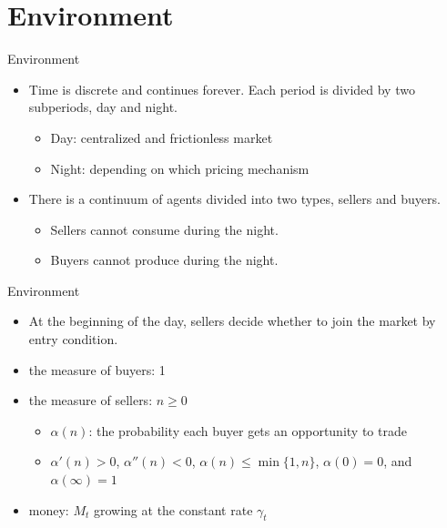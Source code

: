 \documentclass{beamer}
\begin{document}
\section{Environment}

\begin{frame}{Environment}
    \begin{itemize}
        \item Time is discrete and continues forever. Each period is divided by two subperiods, day and night.
        \begin{itemize}
            \item Day: centralized and frictionless market 
            \item Night: depending on which pricing mechanism
        \end{itemize}
        \item There is a continuum of agents divided into two types, sellers and buyers.
        \begin{itemize}
            \item Sellers cannot consume during the night.
            \item Buyers cannot produce during the night.
        \end{itemize}
    \end{itemize}
\end{frame}

\begin{frame}{Environment}
    \begin{itemize}
        \item At the beginning of the day, sellers decide whether to join the market by entry condition.
        \item the measure of buyers: 1
        \item the measure of sellers: $n \geq 0$ 
        \begin{itemize}
            \item $\alpha(n)$: the probability each buyer gets an opportunity to trade
            \item $\alpha'(n) > 0$, $\alpha''(n) < 0$, $\alpha(n) \leq \min\{1,n\}$, $\alpha(0) = 0$, and $\alpha(\infty) = 1$
        \end{itemize}
        \item money: $M_{t}$ growing at the constant rate $\gamma_{t}$
    \end{itemize}
    
\end{frame}
\end{document}
